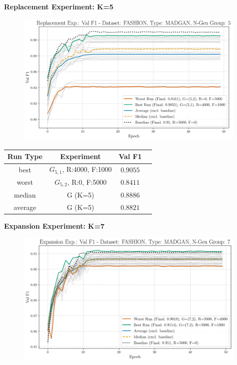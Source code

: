\noindent\textbf{Replacement Experiment: K=5}
\begin{figure}[htbp]
	\centering
	\includegraphics[width=.85\textwidth]{abb/strat_classifier_performance/FASHION_STRATIFIED_CLASSIFIERS_MADGAN_NEW/replacement_experiments/val_f1_score_MADGAN_FASHION_n_gen_5_all.png}
	\label{fig:app_strat_class_performance_replacement_exp._val_f1_score_5}
\end{figure}
\begin{table}[H]
	\vspace{-1em}
	\centering
	\begin{tabular}{|c|c|c|c|}
		\hline
		Run Type & Experiment & Val F1 \\ \hline
		best & \(G_{5, 1}\), R:4000, F:1000 & $0.9055$\\ \hline
		worst & \(G_{5, 2}\), R:0, F:5000 & $0.8411$\\ \hline
		median & G (K=5) & $0.8886$\\ \hline
		average & G (K=5) & $0.8821$
		\\ \hline
	\end{tabular}
\end{table}
\newpage
\noindent\textbf{Expansion Experiment: K=7}
\begin{figure}[htbp]
	\centering
	\includegraphics[width=.85\textwidth]{abb/strat_classifier_performance/FASHION_STRATIFIED_CLASSIFIERS_MADGAN_NEW/expansion_experiments/val_f1_score_MADGAN_FASHION_n_gen_7_all.png}
	\label{fig:app_strat_class_performance_expansion_exp._val_f1_score_7}
\end{figure}
